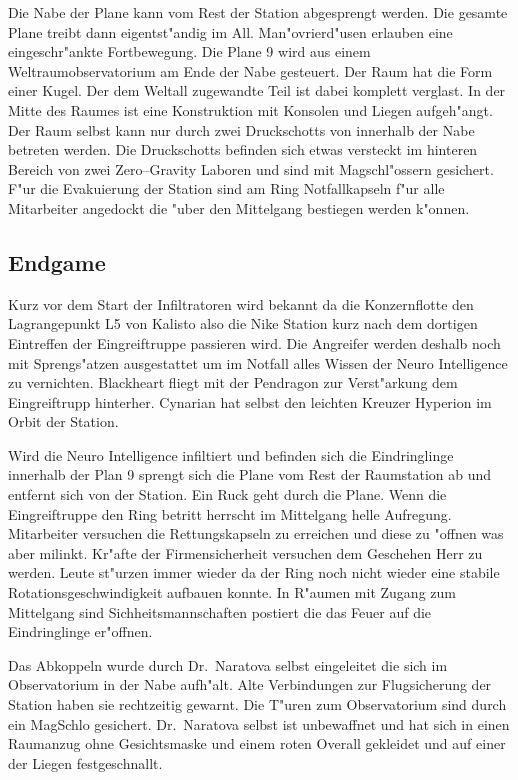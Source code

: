 Die Nabe der Plane kann vom Rest der Station abgesprengt werden. Die gesamte Plane treibt dann eigentst"andig im All. Man"ovrierd"usen erlauben eine eingeschr"ankte Fortbewegung. Die Plane 9 wird aus einem Weltraumobservatorium am Ende der Nabe gesteuert. Der Raum hat die Form einer Kugel. Der dem Weltall zugewandte Teil ist dabei komplett verglast. In der Mitte des Raumes ist eine Konstruktion mit Konsolen und Liegen aufgeh"angt. Der Raum selbst kann nur durch zwei Druckschotts von innerhalb der Nabe betreten werden. Die Druckschotts befinden sich etwas versteckt im hinteren Bereich von zwei Zero--Gravity Laboren und sind mit Magschl"ossern gesichert. F"ur die Evakuierung der Station sind am Ring Notfallkapseln f"ur alle Mitarbeiter angedockt die "uber den Mittelgang bestiegen werden k"onnen.

\subsection{Endgame}

Kurz vor dem Start der Infiltratoren wird bekannt da\3 die Konzernflotte den Lagrangepunkt L5 von Kalisto also die Nike Station kurz nach dem dortigen Eintreffen der Eingreiftruppe passieren wird. Die Angreifer werden deshalb noch mit Sprengs"atzen ausgestattet um im Notfall alles Wissen der Neuro Intelligence zu vernichten. Blackheart fliegt mit der Pendragon zur Verst"arkung dem Eingreiftrupp hinterher. Cynarian hat selbst den leichten Kreuzer Hyperion im Orbit der Station.

Wird die Neuro Intelligence infiltiert und befinden sich die Eindringlinge innerhalb der Plan 9 sprengt sich die Plane vom Rest der Raumstation ab und entfernt sich von der Station. Ein Ruck geht durch die Plane. Wenn die Eingreiftruppe den Ring betritt herrscht im Mittelgang helle Aufregung. Mitarbeiter versuchen die Rettungskapseln zu erreichen und diese zu "offnen was aber mi\3linkt. Kr"afte der Firmensicherheit versuchen dem Geschehen Herr zu werden. Leute st"urzen immer wieder da der Ring noch nicht wieder eine stabile Rotationsgeschwindigkeit aufbauen konnte. In R"aumen mit Zugang zum Mittelgang sind Sichheitsmannschaften postiert die das Feuer auf die Eindringlinge er"offnen.

Das Abkoppeln wurde durch Dr.~Naratova selbst eingeleitet die sich im Observatorium in der Nabe aufh"alt. Alte Verbindungen zur Flugsicherung der Station haben sie rechtzeitig gewarnt. Die T"uren zum Observatorium sind durch ein MagSchlo\3 gesichert. Dr.~Naratova selbst ist unbewaffnet und hat sich in einen Raumanzug ohne Gesichtsmaske und einem roten Overall gekleidet und auf einer der Liegen festgeschnallt.

